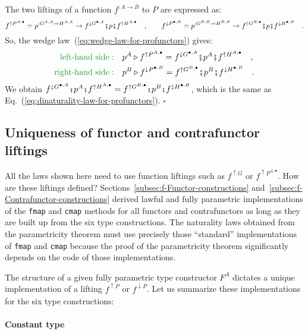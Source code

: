 The two liftings of a function $f^{:A\rightarrow B}$ to $P$ are
expressed as:
\[
f^{\uparrow P^{A,\bullet}}=p^{:G^{A,A}\rightarrow H^{A,A}}\rightarrow f^{\downarrow G^{\bullet,A}}\bef p\bef f^{\uparrow H^{A,\bullet}}\quad,\quad\quad f^{\downarrow P^{\bullet,B}}=p^{:G^{B,B}\rightarrow H^{B,B}}\rightarrow f^{\uparrow G^{B,\bullet}}\bef p\bef f^{\downarrow H^{\bullet,B}}\quad.
\]
So, the wedge law~(\ref{eq:wedge-law-for-profunctors}) gives:
\begin{align*}
{\color{greenunder}\text{left-hand side}:}\quad & p^{A}\triangleright f^{\uparrow P^{A,\bullet}}=f^{\downarrow G^{\bullet,A}}\bef p^{A}\bef f^{\uparrow H^{A,\bullet}}\quad,\\
{\color{greenunder}\text{right-hand side}:}\quad & p^{B}\triangleright f^{\downarrow P^{\bullet,B}}=f^{\uparrow G^{B,\bullet}}\bef p^{B}\bef f^{\downarrow H^{\bullet,B}}\quad.
\end{align*}
We obtain $f^{\downarrow G^{\bullet,A}}\bef p^{A}\bef f^{\uparrow H^{A,\bullet}}=f^{\uparrow G^{B,\bullet}}\bef p^{B}\bef f^{\downarrow H^{\bullet,B}}$,
which is the same as Eq.~(\ref{eq:dinaturality-law-for-profunctors}).
$\square$

\subsection{Uniqueness of functor and contrafunctor liftings\label{sec:Uniqueness-of-functor-and-contrafunctor} }

All the laws shown here need to use function liftings such as $f^{\uparrow G}$
or $f^{\uparrow P^{A,\bullet}}$. How are these liftings defined?
Sections~\ref{subsec:f-Functor-constructions} and~\ref{subsec:f-Contrafunctor-constructions}
derived lawful and fully parametric implementations of the \lstinline!fmap!
and \lstinline!cmap! methods for all functors and contrafunctors
as long as they are built up from the six type constructions. The
naturality laws obtained from the parametricity theorem must use precisely
those \textsf{``}standard\textsf{''} implementations of \lstinline!fmap! and \lstinline!cmap!
because the proof of the parametricity theorem significantly depends
on the code of those implementations.

The structure of a given fully parametric type constructor $F^{A}$
dictates a unique implementation of a lifting $f^{\uparrow P}$ or
$f^{\downarrow P}$. Let us summarize these implementations for the
six type constructions:

\paragraph{Constant type}

